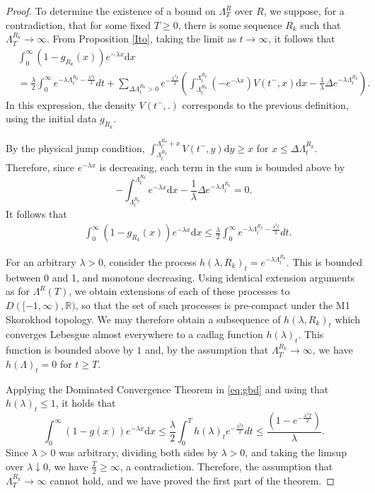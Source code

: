 \documentclass[11pt]{article}
\theoremstyle{plain}
\theoremstyle{remark}
\theoremstyle{definition}
\numberwithin{equation}{section}
\begin{document}
\begin{proof}
To determine the existence of a bound on $\Lambda_T^{R}$ over $R$, we suppose, for a contradiction, that for some fixed $T\geq 0$, there is some sequence $R_k$ such that $\Lambda_T^{ R_k}\rightarrow\infty$. From Proposition \ref{Ito}, taking the limit as $t\rightarrow\infty$, it follows that
\begin{align*}
&\int_0^\infty (1-g_{R_k}(x))e^{-\lambda x}\textrm{d}x\\
&=\frac{\lambda}{2}\int_0^\infty e^{-\lambda \Lambda^{R_k}_{t^-}-\frac{\lambda^2t}{2}}dt+\sum_{\Delta \Lambda^{R_k}_t>0}e^{-\frac{\lambda^2t}{2}}\left(\int_{\Lambda^{R_k}_{t^-}}^{\Lambda^{R_k}_t}\left(-e^{-\lambda x}\right) V(t^-,x)\textrm{d}x-\frac{1}{\lambda}\Delta e^{-\lambda \Lambda^{R_k}_t}\right).\end{align*}
In this expression, the density $V(t^-,.)$ corresponds to the previous definition, using the initial data $g_{R_k}$.

By the physical jump condition, $\int_{\Lambda^{R_k}_{t^-}}^{\Lambda^{R_k}_{t^-}+x} V(t^-,y)\textrm{d}y\geq x$ for $x\leq \Delta \Lambda^{R_k}_t$. Therefore, since $e^{-\lambda x}$ is decreasing, each term in the sum is bounded above by $$-\int_{\Lambda^{R_k}_{t^-}}^{\Lambda^{R_k}_t} e^{-\lambda x}\textrm{d}x-\frac{1}{\lambda}\Delta e^{-\lambda \Lambda^{R_k}_t}=0.$$
It follows that
\begin{align} \label{eq:gbd}
    &\int_0^\infty (1-g_{R_k}(x))e^{-\lambda x}\textrm{d}x
    \leq \frac{\lambda}{2}\int_0^\infty e^{-\lambda \Lambda^{R_k}_{t^-}-\frac{\lambda^2t}{2}}dt.
\end{align}
        
For an arbitrary $\lambda>0$, consider the process $h(\lambda,R_k)_t=e^{-\lambda \Lambda^{R_k}_t}$. This is bounded between 0 and 1, and monotone decreasing. Using identical extension arguments as for $\Lambda^R(T)$, we obtain extensions of each of these processes to $D([-1,\infty),\mathbb{R})$, so that the set of such processes is pre-compact under the M1 Skorokhod topology. We may therefore obtain a subsequence of $h(\lambda,R_k)_t$ which converges Lebesgue almost everywhere to a cadlag function $h(\lambda)_t$. This function is bounded above by $1$ and, by the assumption that $\Lambda_T^{ R_k}\rightarrow\infty$, we have $h(\Lambda)_t=0$ for $t\geq T$.

Applying the Dominated Convergence Theorem in \eqref{eq:gbd} and using that $h(\lambda)_t\leq 1$, it holds that
$$ \int_0^\infty ( 1-g(x))e^{-\lambda x}\textrm{d}x\leq \frac{\lambda}{2} \int_0^T h(\lambda)_te^{-\frac{\lambda^2t}{2}}dt \leq \frac{\left(1-e^{-\frac{\lambda^2T}{2}}\right)}{\lambda}.$$
Since $\lambda>0$ was arbitrary, dividing both sides by $\lambda>0$, and taking the limsup over $\lambda \downarrow 0$, we have $\frac{T}{2}\geq \infty$, a contradiction. Therefore, the assumption that $\Lambda_T^{R_k}\rightarrow\infty$ cannot hold, and we have proved the first part of the theorem.


\end{proof}
\end{document}
